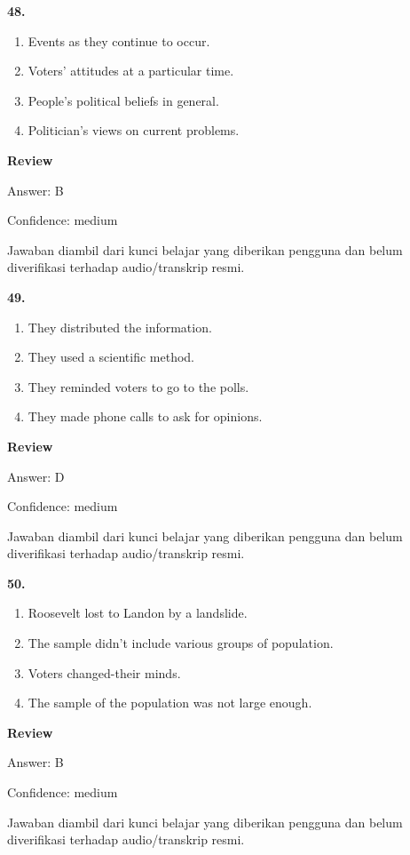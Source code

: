 \documentclass[12pt]{article}
\begin{document}
\noindent\textbf{48.}
\begin{enumerate}[label=(\Alph*),leftmargin=*,itemsep=0.2em]
\item Events as they continue to occur.
\item Voters' attitudes at a particular time.
\item People's political beliefs in general.
\item Politician's views on current problems.
\end{enumerate}
\par
\begingroup
\setlength{\parskip}{0pt}
\setlength{\parindent}{0pt}
\textbf{Review}\par
Answer: B\par
Confidence: medium\par
Jawaban diambil dari kunci belajar yang diberikan pengguna dan belum diverifikasi terhadap audio/transkrip resmi.\par
\endgroup
\par
\vspace{0.25\baselineskip}
\noindent\textbf{49.}
\begin{enumerate}[label=(\Alph*),leftmargin=*,itemsep=0.2em]
\item They distributed the information.
\item They used a scientific method.
\item They reminded voters to go to the polls.
\item They made phone calls to ask for opinions.
\end{enumerate}
\par
\begingroup
\setlength{\parskip}{0pt}
\setlength{\parindent}{0pt}
\textbf{Review}\par
Answer: D\par
Confidence: medium\par
Jawaban diambil dari kunci belajar yang diberikan pengguna dan belum diverifikasi terhadap audio/transkrip resmi.\par
\endgroup
\par
\vspace{0.25\baselineskip}
\noindent\textbf{50.}
\begin{enumerate}[label=(\Alph*),leftmargin=*,itemsep=0.2em]
\item Roosevelt lost to Landon by a landslide.
\item The sample didn't include various groups of population.
\item Voters changed-their minds.
\item The sample of the population was not large enough.
\end{enumerate}
\par
\begingroup
\setlength{\parskip}{0pt}
\setlength{\parindent}{0pt}
\textbf{Review}\par
Answer: B\par
Confidence: medium\par
Jawaban diambil dari kunci belajar yang diberikan pengguna dan belum diverifikasi terhadap audio/transkrip resmi.\par
\endgroup
\par
\vspace{0.25\baselineskip}
\end{document}
